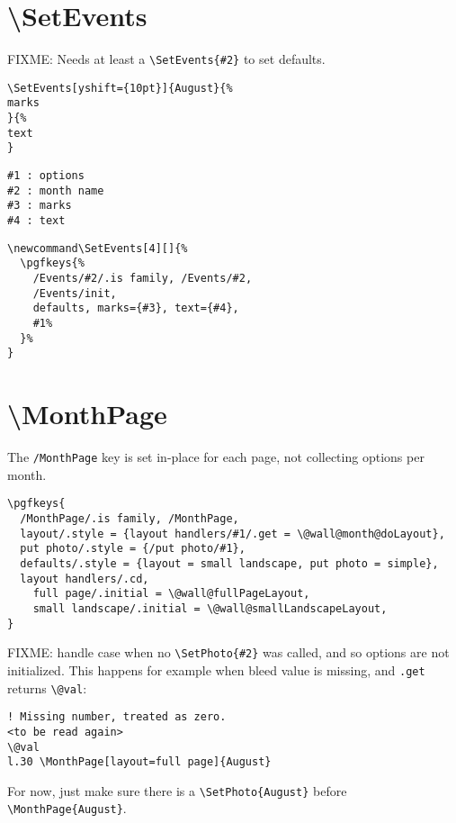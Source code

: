 \documentclass[11pt,oneside]{memoir-article}
\begin{document}
\section{\textbackslash SetEvents}
\label{sec:orgde29618}

FIXME: Needs at least a \texttt{\textbackslash{}SetEvents\{\#2\}} to set defaults.

\begin{verbatim}
\SetEvents[yshift={10pt}]{August}{%
marks
}{%
text
}
\end{verbatim}

\begin{verbatim}
#1 : options
#2 : month name
#3 : marks
#4 : text
\end{verbatim}

\begin{verbatim}
\newcommand\SetEvents[4][]{%
  \pgfkeys{%
    /Events/#2/.is family, /Events/#2,
    /Events/init,
    defaults, marks={#3}, text={#4},
    #1%
  }%
}
\end{verbatim}

\section{\textbackslash MonthPage}
\label{sec:org6cd54c1}

The \texttt{/MonthPage} key is set in-place for each page, not collecting options per month.

\begin{verbatim}
\pgfkeys{
  /MonthPage/.is family, /MonthPage,
  layout/.style = {layout handlers/#1/.get = \@wall@month@doLayout},
  put photo/.style = {/put photo/#1},
  defaults/.style = {layout = small landscape, put photo = simple},
  layout handlers/.cd,
    full page/.initial = \@wall@fullPageLayout,
    small landscape/.initial = \@wall@smallLandscapeLayout,
}
\end{verbatim}

FIXME: handle case when no \texttt{\textbackslash{}SetPhoto\{\#2\}} was called, and so options are not
initialized. This happens for example when bleed value is missing, and \texttt{.get}
returns \texttt{\textbackslash{}@val}:

\begin{verbatim}
! Missing number, treated as zero.
<to be read again> 
\@val 
l.30 \MonthPage[layout=full page]{August}
\end{verbatim}

For now, just make sure there is a \texttt{\textbackslash{}SetPhoto\{August\}} before \texttt{\textbackslash{}MonthPage\{August\}}.
\end{document}
